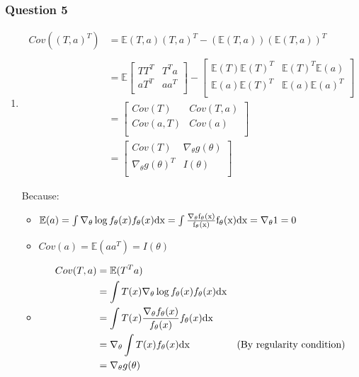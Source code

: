 \documentclass[12pt]{article}
\newcommand{\Q}[1]{\subsubsection*{Question #1}}
\newcommand{\Es}[1]{\mathbb{E}(#1)}
\begin{document}
\Q{5}

\begin{enumerate}
\item 

\begin{align*}
Cov( (T, a)^T ) &= \mathbb{E} (T, a) (T, a)^T -  (\mathbb{E} (T, a))(\mathbb{E} (T, a))^T\\
\\ &= \mathbb{E} 
\begin{bmatrix}TT^T & T^T a \\ aT^T & aa^T \\\end{bmatrix} 
- \begin{bmatrix}\Es T \Es T^T & \Es T^T \Es a \\ \Es a \Es T^T & \Es a \Es a^T \\\end{bmatrix} 
\\ &= 
\begin{bmatrix}Cov(T) & Cov(T,a) \\ Cov(a,T) & Cov(a) \\\end{bmatrix} 
\\ &= 
\begin{bmatrix}Cov(T) & \nabla_\theta g(\theta) \\ \nabla_\theta g(\theta)^T & I(\theta) \\\end{bmatrix} 
\end{align*}

Because:
\begin{itemize}
\item $\Es{a} = \int \nabla_\theta \log f_\theta(x) f_\theta(x) \rm{d}x 
= \int \frac{\nabla_\theta f_\theta(x)}{f_\theta(x)}f_\theta(x) \rm{d}x = \nabla_\theta 1 = 0$
\item $Cov(a) = \Es{aa^T} = I(\theta)$

\item
\begin{align*}
Cov(T, a) &= \Es{T^T a} \\
&= \int T(x) \nabla_\theta \log f_{\theta}(x)  f_{\theta}(x)\rm{d}x \\
&= \int T(x) \frac{\nabla_\theta f_{\theta}(x)}{ f_{\theta}(x)} f_{\theta}(x)\rm{d}x \\
&= \nabla_\theta \int T(x) f_{\theta}(x)\rm{d}x & \text{(By regularity condition)} \\
&= \nabla_\theta g(\theta)
\end{align*}
\end{itemize}


\end{enumerate}
\end{document}

